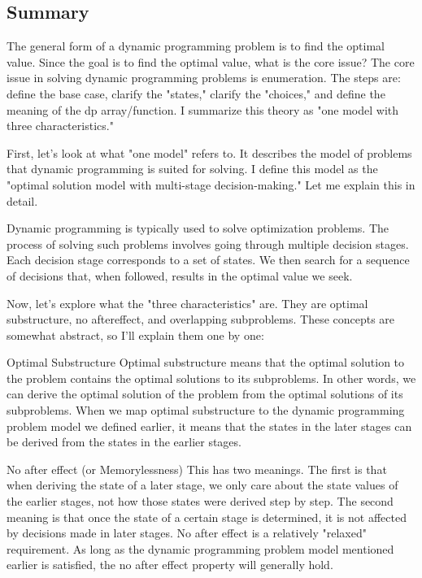 \documentclass[a4paper,11pt,twoside]{book}
\begin{document}
\subsection{Summary}


	\par The general form of a dynamic programming problem is to find the optimal value. Since the goal is to find the optimal value, what is the core issue? The core issue in solving dynamic programming problems is enumeration. The steps are: define the base case, clarify the "states," clarify the "choices," and define the meaning of the dp array/function. I summarize this theory as "one model with three characteristics."
	
	\par First, let's look at what "one model" refers to. It describes the model of problems that dynamic programming is suited for solving. I define this model as the "optimal solution model with multi-stage decision-making." Let me explain this in detail.
	
	\par Dynamic programming is typically used to solve optimization problems. The process of solving such problems involves going through multiple decision stages. Each decision stage corresponds to a set of states. We then search for a sequence of decisions that, when followed, results in the optimal value we seek.
	
	\par Now, let's explore what the "three characteristics" are. They are optimal substructure, no aftereffect, and overlapping subproblems. These concepts are somewhat abstract, so I'll explain them one by one:
	
	\par Optimal Substructure
	Optimal substructure means that the optimal solution to the problem contains the optimal solutions to its subproblems. In other words, we can derive the optimal solution of the problem from the optimal solutions of its subproblems. When we map optimal substructure to the dynamic programming problem model we defined earlier, it means that the states in the later stages can be derived from the states in the earlier stages.
	
	\par No after effect (or Memorylessness)
	This has two meanings. The first is that when deriving the state of a later stage, we only care about the state values of the earlier stages, not how those states were derived step by step. The second meaning is that once the state of a certain stage is determined, it is not affected by decisions made in later stages. No after effect is a relatively "relaxed" requirement. As long as the dynamic programming problem model mentioned earlier is satisfied, the no after effect property will generally hold.
	
\end{document}
